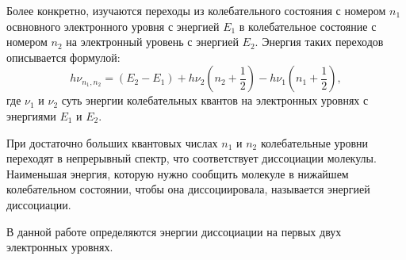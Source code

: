 \documentclass[a4paper,12pt]{article} %
\begin{document}
Более конкретно, изучаются переходы из колебательного состояния с номером $n_1$ освновного электронного уровня с энергией $E_1$ в колебательное состояние с номером $n_2$ на электронный уровень с энергией $E_2$. Энергия таких переходов описывается формулой:
\begin{equation}
	h \nu_{n_1,n_2}=(E_2-E_1)+h\nu_2(n_2+\dfrac{1}{2})-h \nu_1(n_1+\dfrac{1}{2}),
\end{equation}
где $\nu_1$ и $\nu_2$ суть энергии колебательных квантов на электронных уровнях с энергиями $E_1$ и $E_2$.

При достаточно больших квантовых числах $n_1$ и $n_2$ колебательные уровни переходят в непрерывный спектр, что соответствует диссоциации молекулы. Наименьшая энергия, которую нужно сообщить молекуле в нижайшем колебательном состоянии, чтобы она диссоциировала, называется энергией диссоциации.

В данной работе определяются энергии диссоциации на первых двух электронных уровнях.
	
\end{document}
